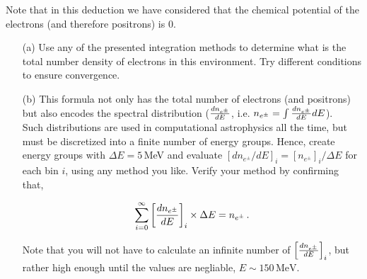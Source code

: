 \documentclass[11pt]{article}
\begin{document}
\begin{enumerate}
 Note that in this deduction we have considered that the chemical potential of the
electrons (and therefore positrons) is 0.

\begin{enumerate}
\item[(a)] Use any of the presented integration methods to determine what
  is the total number density of electrons in this environment. Try different conditions to ensure convergence. 

\item[(b)] This formula not only has the total number of
  electrons (and positrons) but also encodes the spectral distribution
  (${dn_{e^\pm} \over dE}$, i.e. $n_{e^\pm} = \int {dn_{e^\pm}\over
    dE} dE$).\\
  Such distributions are used in computational
  astrophysics all the time, but must be discretized into a finite
  number of energy groups. Hence, create energy groups with $\Delta E =
  5\,$MeV and evaluate $[dn_{e^\pm}/dE]_i = [n_{e^\pm}]_i / \Delta E$
  for each bin $i$, using any method you like. Verify your
  method by confirming that,

\begin{equation}
\sum_{i=0}^{\infty}\left[{dn_{e^\pm}\over
    dE}\right]_i \times \Delta E = n_{e^\pm}\,.
\end{equation}

Note that you will not have to calculate an infinite number of $\left[{dn_{e^\pm}\over
    dE}\right]_i$, but rather high enough until
the values are negliable, $E \sim 150\,\mathrm{MeV}$. \newline


\end{enumerate}
\end{enumerate}
\end{document}
